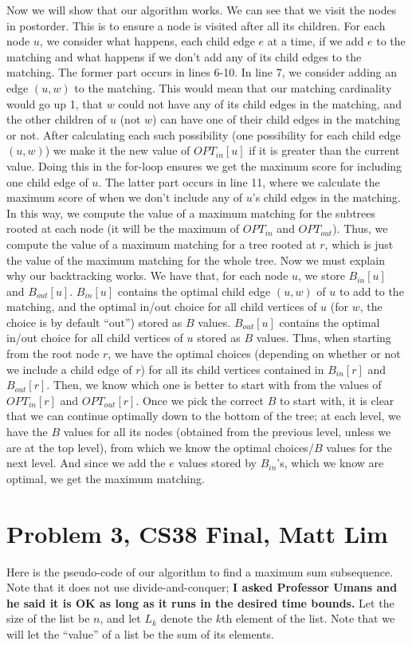 \documentclass{article}
\begin{document}
Now we will show that our algorithm works. We can see that we visit the nodes in
postorder. This is to ensure a node is visited after all its children. For each
node $u$, we consider what happens, each child edge $e$ at a time, if we add
$e$ to the matching and what happens if we don't add any of its child
edges to the matching. The former part occurs in lines 6-10. In line 7, we
consider adding an edge $(u,w)$ to the matching. This would mean that our matching
cardinality would go up 1, that $w$ could not have any of its child edges in the
matching, and the other children of $u$ (not $w$) can have one of their child
edges in the matching or not. After calculating each such possibility (one
possibility for each child edge $(u,w)$) we make it the new value of
$OPT_{in}[u]$ if it is greater than the current value. Doing this in the
for-loop ensures we get the maximum score for including one child edge of $u$.
The latter part occurs in line 11, where we calculate the maximum score of when
we don't include any of $u$'s child edges in the matching. In this way, we
compute the value of a maximum matching for the subtrees rooted at each node (it
will be the maximum of $OPT_{in}$ and $OPT_{out}$).
Thus, we compute the value of a maximum matching for a tree rooted at $r$, which
is just the value of the maximum matching for the whole tree. Now we must
explain why our backtracking works. We have that, for each node $u$, we store
$B_{in}[u]$ and $B_{out}[u]$. $B_{in}[u]$ contains the optimal child edge
$(u,w)$ of $u$ to add to the matching, and the optimal in/out choice for all child vertices of
$u$ (for $w$, the choice is by default ``out'') stored as $B$ values. $B_{out}[u]$ contains the
optimal in/out choice for all child vertices of $u$ stored as $B$ values. Thus, when starting from the
root node $r$, we have the optimal choices (depending on whether or not we
include a child edge of $r$) for all its child vertices contained
in $B_{in}[r]$ and $B_{out}[r]$. Then, we know which one is better to start with from the values
of $OPT_{in}[r]$ and $OPT_{out}[r]$. Once we pick the correct $B$ to start with,
it is clear that we can continue optimally down to the bottom of the
tree; at each level, we have the $B$ values for all its nodes
(obtained from the previous level, unless we are at the top level),
from which we know the optimal choices/$B$
values for the next level. And since we add the $e$ values stored by $B_{in}$'s,
which we know are optimal, we get the maximum matching.
\newpage

\section*{Problem 3, CS38 Final, Matt Lim}
Here is the pseudo-code of our algorithm to find a maximum sum subsequence. Note
that it does not use divide-and-conquer; \textbf{I asked Professor Umans and he said it
is OK as long as it runs in the desired time bounds.} Let the size of the
list be $n$, and let $L_k$ denote the $k$th element of the list.
Note that we will let the ``value'' of a list be the sum of its elements.
\end{document}
